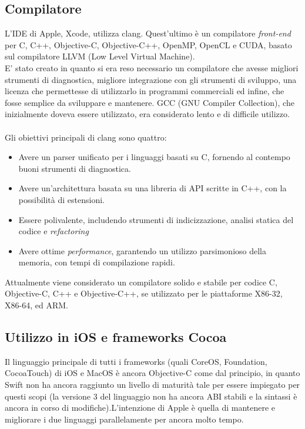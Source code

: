 \subsection{Compilatore}
L'IDE di Apple, Xcode, utilizza clang. Quest'ultimo è un compilatore \textit{front-end} per C, C++, Objective-C, Objective-C++, OpenMP, OpenCL e CUDA, basato sul compilatore LLVM (Low Level Virtual Machine).\\E' stato creato in quanto si era reso necessario un compilatore che avesse migliori strumenti di diagnostica, migliore integrazione con gli strumenti di sviluppo, una licenza che permettesse di utilizzarlo in programmi commerciali ed infine, che fosse semplice da sviluppare e mantenere. GCC (GNU Compiler Collection), che inizialmente doveva essere utilizzato, era considerato lento e di difficile utilizzo.\\\\Gli obiettivi principali di clang sono quattro:
\begin{itemize} 
\item Avere un parser unificato per i linguaggi basati su C, fornendo al contempo buoni strumenti di diagnostica.
\item Avere un'architettura basata su una libreria di API scritte in C++, con la possibilità di estensioni.
\item Essere polivalente, includendo strumenti di indicizzazione, analisi statica del codice e \textit{refactoring}
\item Avere ottime \textit{performance}, garantendo un utilizzo parsimonioso della memoria, con tempi di compilazione rapidi.
\end{itemize}
Attualmente viene considerato un compilatore solido e stabile per codice C, Objective-C, C++ e Objective-C++, se utilizzato per le piattaforme X86-32, X86-64, ed ARM.  
\subsection{Utilizzo in iOS e frameworks Cocoa}
Il linguaggio principale di tutti i frameworks (quali CoreOS, Foundation, CocoaTouch) di iOS e MacOS è ancora Objective-C come dal principio, in quanto Swift non ha ancora raggiunto un livello di maturità tale per essere impiegato per questi scopi (la versione 3 del linguaggio non ha ancora ABI stabili e la sintassi è ancora in corso di modifiche).L'intenzione di Apple è quella di mantenere e migliorare i due linguaggi parallelamente per ancora molto tempo.